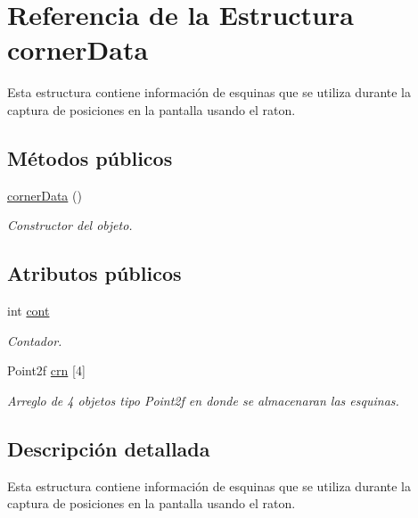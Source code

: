\hypertarget{structcornerData}{\section{Referencia de la Estructura corner\+Data}
\label{structcornerData}
}


Esta estructura contiene información de esquinas que se utiliza durante la captura de posiciones en la pantalla usando el raton.  


\subsection*{Métodos públicos}
\begin{DoxyCompactItemize}
\item 
\hyperlink{structcornerData_a9f4acaee1021cd3fae7619a520f2da33}{corner\+Data} ()
\begin{DoxyCompactList}\small\item\em Constructor del objeto. \end{DoxyCompactList}\end{DoxyCompactItemize}
\subsection*{Atributos públicos}
\begin{DoxyCompactItemize}
\item 
int \hyperlink{structcornerData_a961800bf60ff693820efbf7f4bc72788}{cont}
\begin{DoxyCompactList}\small\item\em Contador. \end{DoxyCompactList}\item 
Point2f \hyperlink{structcornerData_a6d9e631d38806edbc61499fd4794baea}{crn} \mbox{[}4\mbox{]}
\begin{DoxyCompactList}\small\item\em Arreglo de 4 objetos tipo Point2f en donde se almacenaran las esquinas. \end{DoxyCompactList}\end{DoxyCompactItemize}


\subsection{Descripción detallada}
Esta estructura contiene información de esquinas que se utiliza durante la captura de posiciones en la pantalla usando el raton. 

